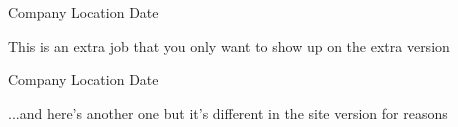  {Company} {Location} {Date}
\begin{entryitems}
    \item{This is an extra job that you only want to show up on the extra version}
\end{entryitems}
 {Company} {Location} {Date}
\begin{entryitems}
\item{...and here's another one but it's different in the site version for reasons}
\end{entryitems}
